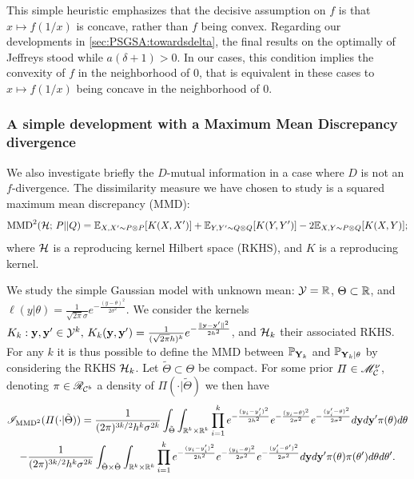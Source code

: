         This simple heuristic emphasizes that the decisive assumption on $f$ is that $x\mapsto f(1/x)$ is concave, rather than $f$ being convex.
        Regarding our developments in  \cref{sec:PSGSA:towardsdelta}, the final results on the optimally of Jeffreys stood while $a(\delta+1)>0$.
        In our cases, this condition implies the convexity of $f$ in the neighborhood of $0$, that is equivalent in these cases to $x\mapsto f(1/x)$ being concave in the neighborhood of $0$.
        



        
        \subsubsection{A simple development with a Maximum Mean Discrepancy divergence}


        We also investigate briefly the $D$-mutual information in a case where $D$ is not an $f$-divergence. The dissimilarity measure we have chosen to study is a squared maximum mean discrepancy (MMD):
                \begin{equation}
                    \text{MMD}^2(\mathcal{H};\,P||Q) = \mathbb{E}_{X,X'\sim P\otimes P}[K(X,X')] + \mathbb{E}_{Y,Y'\sim Q\otimes Q}[K(Y,Y')] - 2\mathbb{E}_{X,Y\sim P\otimes Q}[K(X,Y)];
                \end{equation}
        where $\mathcal{H}$ is a reproducing kernel Hilbert space (RKHS), and $K$ is a reproducing kernel.

        We study the simple Gaussian model with unknown mean: $\mathcal{Y}=\mathbb{R}$, $\Theta\subset\mathbb{R} $, and $\ell(y|\theta)=\frac{1}{\sqrt{2\pi}\sigma}e^{-\frac{(y-\theta)^2}{2\sigma^2}}$. 
        We consider the kernels $K_k:\mathbf{y},\mathbf{y}'\in\mathcal{Y}^k,\,K_k(\mathbf{y},\mathbf{y}')= \frac{1}{(\sqrt{2\pi}h)^k}e^{-\frac{\|\mathbf{y}-\mathbf{y}'\|^2}{2h^2}}$, and $\mathcal{H}_k$ their associated RKHS. 
        For any $k$ it is thus possible to define the MMD between $\mathbb{P}_{\mathbf{Y}_k}$ and $\mathbb{P}_{\mathbf{Y}_k|\theta}$ by considering the RKHS $\mathcal{H}_k$.
        Let $\tilde\Theta\subset\Theta$ be compact. %
        For some prior $\varPi\in\mathscr{M}^\nu_{\mathcal{C}}$, denoting $\pi\in\mathscr{R}_{\mathcal{C}^b}$ a  density of $\varPi(\cdot|\tilde\Theta)$ we then have
            \begin{multline}
                \mathscr{I}_{\text{MMD}^2}(\varPi(\cdot|\tilde\Theta)) =\frac{1}{(2\pi)^{3k/2} h^k\sigma^{2k}} \int_{\tilde\Theta}\int_{\mathbb{R}^k\times\mathbb{R}^k} \prod_{i=1}^ke^{-\frac{(y_i-y_i')^2}{2h^2}} e^{-\frac{(y_i-\theta)^2}{2\sigma^2} } e^{-\frac{(y_i'-\theta)^2}{2\sigma^2} }  d\mathbf{y}d\mathbf{y}'\pi(\theta)d\theta \\
                - \frac{1}{(2\pi)^{3k/2}h^k\sigma^{2k}} \int_{\tilde\Theta\times\tilde\Theta}\int_{\mathbb{R}^k\times\mathbb{R}^k} \prod_{i=1}^ke^{-\frac{(y_i-y_i')^2}{2h^2}} e^{-\frac{(y_i-\theta)^2}{2\sigma^2} } e^{-\frac{(y_i'-\theta')^2}{2\sigma^2} }  d\mathbf{y}d\mathbf{y}'\pi(\theta)\pi(\theta')d\theta d\theta'.
            \end{multline}

